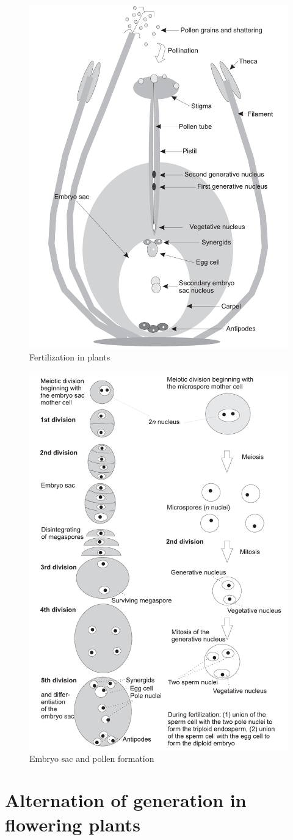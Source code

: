 \documentclass[11pt,ignorenonframetext,aspectratio=169]{beamer}
\begin{document}
\begin{frame}{}
\protect\hypertarget{section-2}{}
\begin{figure}

{\centering \includegraphics[width=0.38\linewidth]{./images/fertilization_in_self_pollinated_species} 

}

\caption{Fertilization in plants}\label{fig:plant-fertilization}
\end{figure}
\end{frame}

\begin{frame}{}
\protect\hypertarget{section-3}{}
\begin{figure}

{\centering \includegraphics[width=0.38\linewidth]{./images/sporogenesis} 

}

\caption{Embryo sac and pollen formation}\label{fig:sporogenesis}
\end{figure}
\end{frame}

\hypertarget{alternation-of-generation-in-flowering-plants}{%
\section{Alternation of generation in flowering
plants}\label{alternation-of-generation-in-flowering-plants}}
\end{document}
